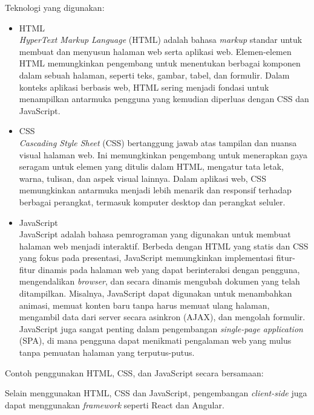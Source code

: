 \begin{enumerate}[label*=\arabic*.,ref=\arabic*]
\begin{enumerate}[label=\alph*.]
                Teknologi yang digunakan:
                \begin{itemize}
                    \item HTML\\
                        \textit{HyperText Markup Language} (HTML) adalah bahasa \textit{markup} standar untuk membuat dan menyusun halaman web serta aplikasi web. Elemen-elemen HTML memungkinkan pengembang untuk menentukan berbagai komponen dalam sebuah halaman, seperti teks, gambar, tabel, dan formulir. Dalam konteks aplikasi berbasis web, HTML sering menjadi fondasi untuk menampilkan antarmuka pengguna yang kemudian diperluas dengan CSS dan JavaScript. 
                    \item CSS\\
                        \textit{Cascading Style Sheet} (CSS) bertanggung jawab atas tampilan dan nuansa visual halaman web. Ini memungkinkan pengembang untuk menerapkan gaya seragam untuk elemen yang ditulis dalam HTML, mengatur tata letak, warna, tulisan, dan aspek visual lainnya. Dalam aplikasi web, CSS memungkinkan antarmuka menjadi lebih menarik dan responsif terhadap berbagai perangkat, termasuk komputer desktop dan perangkat seluler. 
                    \item JavaScript\\
                        JavaScript adalah bahasa pemrograman yang digunakan untuk membuat halaman web menjadi interaktif. Berbeda dengan HTML yang statis dan CSS yang fokus pada presentasi, JavaScript memungkinkan implementasi fitur-fitur dinamis pada halaman web yang dapat berinteraksi dengan pengguna, mengendalikan \textit{browser}, dan secara dinamis mengubah dokumen yang telah ditampilkan. Misalnya, JavaScript dapat digunakan untuk menambahkan animasi, memuat konten baru tanpa harus memuat ulang halaman, mengambil data dari server secara asinkron (AJAX), dan mengolah formulir. JavaScript juga sangat penting dalam pengembangan \textit{single-page application} (SPA), di mana pengguna dapat menikmati pengalaman web yang mulus tanpa pemuatan halaman yang terputus-putus.
                \end{itemize}

                Contoh penggunakan HTML, CSS, dan JavaScript secara bersamaan:
                
                
                Selain menggunakan HTML, CSS dan JavaScript, pengembangan \textit{client-side} juga dapat menggunakan \textit{framework} seperti React dan Angular.
                

\end{enumerate}
\end{enumerate}
